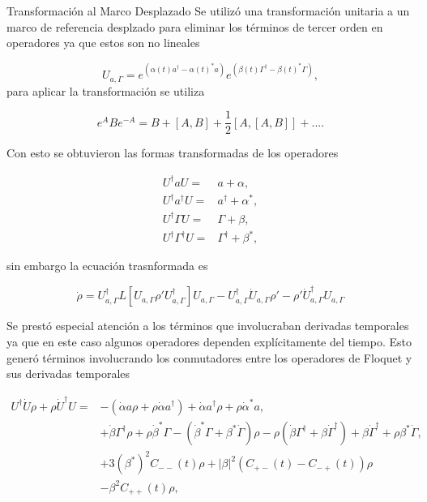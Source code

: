 \documentclass[11pt]{beamer}
\begin{document}
\begin{frame}{Transformación al Marco Desplazado}
Se utilizó una transformación unitaria a un marco de referencia desplzado para eliminar los términos de tercer orden en operadores ya que estos son no lineales

\begin{equation}
U_{a,\Gamma} = e^{(\alpha(t) a^\dagger - \alpha(t)^*a)}e^{(\beta(t) \Gamma^\dagger - \beta(t)^*\Gamma)},
\end{equation} para aplicar la transformación se utiliza

\begin{equation}
e^{A} B e^{-A} = B + [A,B] + \frac{1}{2}[A,[A,B]] + ... .
\end{equation}
\end{frame}

\begin{frame}
Con esto se obtuvieron las formas transformadas de los operadores

\begin{align}
U^{\dagger} a U =& a + \alpha, \\
U^{\dagger} a^{\dagger} U =& a^{\dagger} + \alpha^*, \\
U^{\dagger} \Gamma U =& \Gamma + \beta, \\
U^{\dagger} \Gamma^{\dagger} U =& \Gamma^{\dagger} + \beta^*, 
\end{align} 

sin embargo la ecuación trasnformada es

\begin{equation}
\dot{\rho} = U_{a,\Gamma}^\dagger L[U_{a,\Gamma} \rho' U_{a,\Gamma}^\dagger]U_{a,\Gamma}-U_{a,\Gamma}^\dagger\dot{U}_{a,\Gamma}\rho'-\rho'\dot{U}_{a,\Gamma}^\dagger U_{a,\Gamma}
\end{equation}

\end{frame}

\begin{frame}
Se prestó especial atención a los términos que involucraban derivadas temporales ya que en este caso algunos operadores dependen explícitamente del tiempo. Esto generó términos involucrando los conmutadores entre los operadores de Floquet y sus derivadas temporales

\begin{align*}
U^{\dagger}\dot{U}\rho + \rho \dot{U}^\dagger U =& -(\dot{\alpha}a \rho + \rho\dot{\alpha}a^{\dagger}) + \dot{\alpha}a^{\dagger}\rho + \rho \dot{\alpha}^*a,\\
&+ \dot{\beta}\Gamma^{\dagger}\rho + \rho\dot{\beta}^*\Gamma-(\dot{\beta}^*\Gamma + \beta^*\dot{\Gamma})\rho - \rho(\dot{\beta} \Gamma^{\dagger} + \beta \dot{\Gamma}^{\dagger}) +\beta \dot{\Gamma}^{\dagger} + \rho\beta^* \dot{\Gamma},\\
&+3(\beta^*)^2C_{--}(t)\rho + |\beta|^2(C_{+-}(t) - C_{-+}(t))\rho \\
&-  \beta^2 C_{++}(t)\rho,
\end{align*}
\end{frame}
\end{document}
